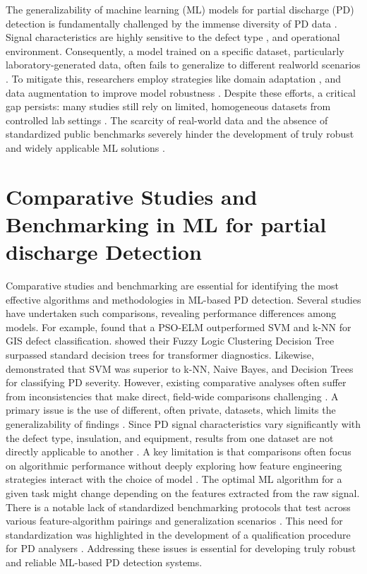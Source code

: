 The generalizability of machine learning (ML) models for partial discharge (PD) detection is fundamentally challenged by the immense diversity of PD data \parencite{Lu_2020_2}. Signal characteristics are highly sensitive to the defect type \parencite{Lee_2020_1, Bin_2020_1, Meitei_2020, Zang_2022_1}, and operational environment. Consequently, a model trained on a specific dataset, particularly laboratory-generated data, often fails to generalize to different realworld scenarios \parencite{Sun_2019_1, Raymond_2022}. To mitigate this, researchers employ strategies like domain adaptation \parencite{Tai_2024, Tuyet_Doan_2024, Niu_2025}, and data augmentation to improve model robustness \parencite{Raymond_2022, Rauscher_2024}. Despite these efforts, a critical gap persists: many studies still rely on limited, homogeneous datasets from controlled lab settings \parencite{Zhang_2016_5}. The scarcity of real-world data and the absence of standardized public benchmarks severely hinder the development of truly robust and widely applicable ML solutions \parencite{Kim_2020_1, Lu_2020_2}.

\section{Comparative Studies and Benchmarking in ML for partial discharge Detection}

Comparative studies and benchmarking are essential for identifying the most effective algorithms and methodologies in ML-based PD detection. Several studies have undertaken such comparisons, revealing performance differences among models. For example, \parencite{Bin_2020_1} found that a PSO-ELM outperformed SVM and k-NN for GIS defect classification. \parencite{Lee_2020_1} showed their Fuzzy Logic Clustering Decision Tree surpassed standard decision trees for transformer diagnostics. Likewise, \parencite{Ma_2021_3} demonstrated that SVM was superior to k-NN, Naive Bayes, and Decision Trees for classifying PD severity. However, existing comparative analyses often suffer from inconsistencies that make direct, field-wide comparisons challenging \parencite{Lu_2020_2}. A primary issue is the use of different, often private, datasets, which limits the generalizability of findings \parencite{Kim_2021}. Since PD signal characteristics vary significantly with the defect type, insulation, and equipment, results from one dataset are not directly applicable to another \parencite{Ranjan_2024}. A key limitation is that comparisons often focus on algorithmic performance without deeply exploring how feature engineering strategies interact with the choice of model \parencite{Govindarajan_2021_2}. The optimal ML algorithm for a given task might change depending on the features extracted from the raw signal. There is a notable lack of standardized benchmarking protocols that test across various feature-algorithm pairings and generalization scenarios \parencite{Lu_2020_2}. This need for standardization was highlighted in the development of a qualification procedure for PD analysers \parencite{Vera_2023_1}. Addressing these issues is essential for developing truly robust and reliable ML-based PD detection systems.

